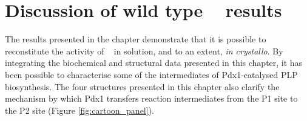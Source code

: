  
\clearpage
\section{Discussion of wild type \atpdx~ results}

The results presented in the chapter demonstrate that it is possible to reconstitute the activity of \atpdx~ in solution, and to an extent, \textit{in crystallo}. By integrating the biochemical and structural data presented in this chapter, it has been possible to characterise some of the intermediates of Pdx1-catalysed PLP biosynthesis. The four structures presented in this chapter also clarify the mechanism by which Pdx1 transfers reaction intermediates from the P1 site to the P2 site (Figure \ref{fig:cartoon_panel}). 

